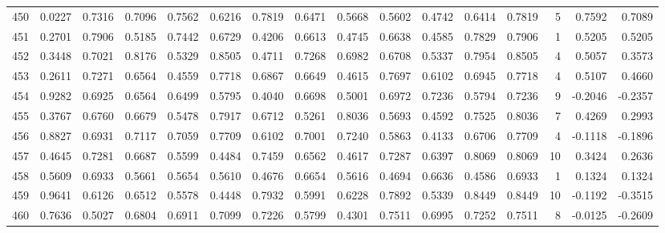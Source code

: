 \begin{tabular}{lrrrrrrrrrrrrrrr}
450 &      0.0227 &  0.7316 &  0.7096 &  0.7562 &  0.6216 &  0.7819 &  0.6471 &  0.5668 &  0.5602 &  0.4742 &   0.6414 &     0.7819 &      5 &                    0.7592 &                     0.7089 \\
451 &      0.2701 &  0.7906 &  0.5185 &  0.7442 &  0.6729 &  0.4206 &  0.6613 &  0.4745 &  0.6638 &  0.4585 &   0.7829 &     0.7906 &      1 &                    0.5205 &                     0.5205 \\
452 &      0.3448 &  0.7021 &  0.8176 &  0.5329 &  0.8505 &  0.4711 &  0.7268 &  0.6982 &  0.6708 &  0.5337 &   0.7954 &     0.8505 &      4 &                    0.5057 &                     0.3573 \\
453 &      0.2611 &  0.7271 &  0.6564 &  0.4559 &  0.7718 &  0.6867 &  0.6649 &  0.4615 &  0.7697 &  0.6102 &   0.6945 &     0.7718 &      4 &                    0.5107 &                     0.4660 \\
454 &      0.9282 &  0.6925 &  0.6564 &  0.6499 &  0.5795 &  0.4040 &  0.6698 &  0.5001 &  0.6972 &  0.7236 &   0.5794 &     0.7236 &      9 &                   -0.2046 &                    -0.2357 \\
455 &      0.3767 &  0.6760 &  0.6679 &  0.5478 &  0.7917 &  0.6712 &  0.5261 &  0.8036 &  0.5693 &  0.4592 &   0.7525 &     0.8036 &      7 &                    0.4269 &                     0.2993 \\
456 &      0.8827 &  0.6931 &  0.7117 &  0.7059 &  0.7709 &  0.6102 &  0.7001 &  0.7240 &  0.5863 &  0.4133 &   0.6706 &     0.7709 &      4 &                   -0.1118 &                    -0.1896 \\
457 &      0.4645 &  0.7281 &  0.6687 &  0.5599 &  0.4484 &  0.7459 &  0.6562 &  0.4617 &  0.7287 &  0.6397 &   0.8069 &     0.8069 &     10 &                    0.3424 &                     0.2636 \\
458 &      0.5609 &  0.6933 &  0.5661 &  0.5654 &  0.5610 &  0.4676 &  0.6654 &  0.5616 &  0.4694 &  0.6636 &   0.4586 &     0.6933 &      1 &                    0.1324 &                     0.1324 \\
459 &      0.9641 &  0.6126 &  0.6512 &  0.5578 &  0.4448 &  0.7932 &  0.5991 &  0.6228 &  0.7892 &  0.5339 &   0.8449 &     0.8449 &     10 &                   -0.1192 &                    -0.3515 \\
460 &      0.7636 &  0.5027 &  0.6804 &  0.6911 &  0.7099 &  0.7226 &  0.5799 &  0.4301 &  0.7511 &  0.6995 &   0.7252 &     0.7511 &      8 &                   -0.0125 &                    -0.2609 \\

\end{tabular}
